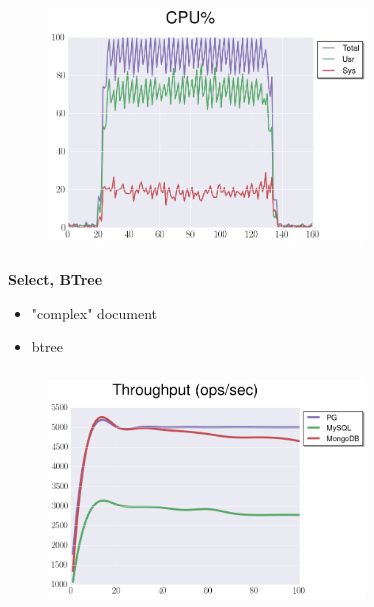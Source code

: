\documentclass[usenames,dvipsnames, 18pt, compress, aspectratio=169]{beamer}
\begin{document}
\begin{frame}
    \frametitle{}
    \begin{center}
    \begin{figure}
        \includegraphics[width=0.75\textwidth,center]{benchmarks/pg_select_cpu_20.png}
    \end{figure}
    \end{center}
\end{frame}

\begin{frame}
    \frametitle{}
    \begin{center}
        \textbf{Select, BTree}
        \begin{itemize}[label={}]
            \item "complex" document
            \item btree
        \end{itemize}
    \end{center}
\end{frame}

\begin{frame}
    \frametitle{}
    \begin{center}
    \begin{figure}
        \includegraphics[width=0.75\textwidth,center]{benchmarks/select_complex_btree_throughput.png}
    \end{figure}
    \end{center}
\end{frame}
\end{document}
